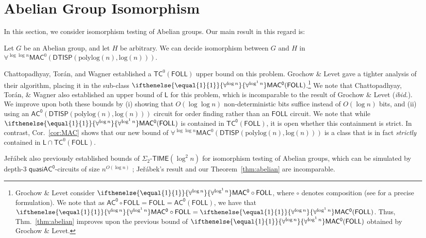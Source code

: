 \documentclass{theoretics}
\newcommand{\alphacc}[1]{\ifthenelse{\equal{#1}{1}}{\forall^{\log n}}{\forall^{\log^{#1}n}}} %
\newcommand{\Cor}[1]{Cor.~\ref{#1}\xspace}
\newcommand{\Thm}[1]{Thm.~\ref{#1}\xspace}
\newcommand*{\ComplexityClass}[1]{\ensuremath{\mathsf{#1}}\xspace}
\newcommand{\DTISP}{\ComplexityClass{DTISP}}
\newcommand{\DTISPpll}{\ensuremath{\DTISP(\mathrm{polylog}(n),\mathrm{log}(n))}\xspace}
\newcommand*{\LogSpace}{\ComplexityClass{L}}
\newcommand{\MACz}{\ComplexityClass{MAC^0}}
\newcommand{\ACz}{\ComplexityClass{AC^0}}
\newcommand{\TCz}{\ComplexityClass{TC^0}}
\newcommand{\qACz}{\ComplexityClass{quasiAC^0}}
\newcommand{\FOLL}{\ComplexityClass{FOLL}}
\begin{document}
\section{Abelian Group Isomorphism}
In this section, we consider isomorphism testing of Abelian groups. Our main result in this regard is:

\begin{theorem} \label{thm:abelian}
Let $G$ be an Abelian group, and let $H$ be arbitrary. We can decide isomorphism between $G$ and $H$ in $\forall^{\log \log n} \mathsf{MAC}^0(\DTISPpll)$.
\end{theorem}

Chattopadhyay, Torán, and Wagner \cite{ChattopadhyayToranWagner} established a $\mathsf{TC}^{0}(\FOLL)$ upper bound on this problem. Grochow \& Levet \cite[Theorem 5]{GrochowLevetWL} gave a tighter analysis of their algorithm, placing it in the sub-class $\alphacc{1}\MACz(\FOLL)$.\footnote{Grochow \& Levet consider $\alphacc{1}\MACz \circ \FOLL$, where $\circ$ denotes composition (see \cite{GrochowLevetWL} for a precise formulation). We note that as $\ACz \circ \FOLL = \FOLL = \ACz(\FOLL)$, we have that $\alphacc{1}\MACz \circ \FOLL = \alphacc{1}\MACz(\FOLL)$. Thus, \Thm{thm:abelian} improves upon the previous bound of $\alphacc{1}\MACz(\FOLL)$ obtained by Grochow \& Levet.} 
We note that Chattopadhyay, Tor\'an, \& Wagner also established an upper bound of $\LogSpace$ for this problem, which is incomparable to the result of Grochow \& Levet (\emph{ibid.}). We improve  upon both these bounds by (i) showing that $O(\log \log n)$ non-deterministic bits suffice instead of $O(\log n)$ bits, and (ii) using an $\ACz(\DTISPpll)$ circuit for order finding rather than an $\FOLL$ circuit. We note that while $\alphacc{1}\MACz(\FOLL)$ is contained in $\TCz(\FOLL)$, it is open whether this containment is strict. In contrast, \Cor{cor:MAC} shows that our new bound of $\forall^{\log \log n} \mathsf{MAC}^0(\DTISPpll)$ is a class that is in fact \textit{strictly} contained in $\LogSpace \cap \mathsf{TC}^{0}(\FOLL)$.

Jeřábek also previously established bounds of $\Sigma_{2}$-$\mathsf{TIME}(\log^{2} n)$ for isomorphism testing of Abelian groups, which can be simulated by depth-$3$ $\qACz$-circuits of size $n^{O(\log n)}$ \cite{JerabekTCSStackExchange}; Jeřábek's result and our Theorem~\ref{thm:abelian} are incomparable.
\end{document}
